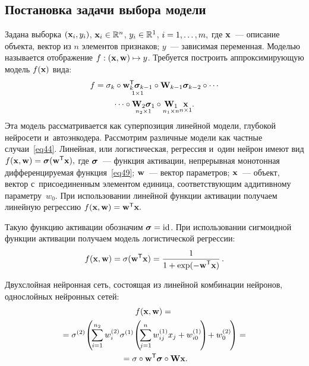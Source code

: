 \begin{multicols}{2}

\section{Постановка задачи выбора модели}

Задана выборка $({\mathbf{x}}_i,y_i)$, $\xb_i \hm\in \mathbb{R}^n$, $y_i\hm\in 
\mathbb{R}^1$, $i\hm=1,\dots,m,$ где ${\mathbf{x}}$~--- описание объекта, вектор из 
$n$ элементов признаков; $y$~--- зависимая переменная. Моделью называется 
отображение $f:({\mathbf{x}},{\mathbf{w}})\mapsto y$. Требуется построить аппроксимирующую 
модель $f({\mathbf{x}})$ вида:
\begin{multline}
\label{eq44}
f = \sigma_k\circ\underset{1\times1}{{\mathbf{w}}_k^\mathsf{T}{\boldsymbol{\sigma}}_{k-
1}}\circ\mathbf{W}_{k-1}{\boldsymbol{\sigma}}_{k-2}\circ\cdots\\
\cdots \circ\underset{n_2 \times 
1}{\mathbf{W}_2{\boldsymbol{\sigma}}_1}\circ \underset{n_1 \times n}{\mathbf{W}_1}\underset{n \times 1}{{\mathbf{x}}}.
\end{multline}
Эта модель рассматривается как суперпозиция линейной модели, глубокой 
нейросети и~автоэнкодера. Рассмотрим различные модели как частные 
случаи~\eqref{eq44}. Линейная, или логистическая, регрессия и~один нейрон 
имеют вид
 $f({\mathbf{x}},{\mathbf{w}})={\boldsymbol{\sigma}}({\mathbf{w}}^\mathsf{T}{\mathbf{x}}),$
где ${\boldsymbol{\sigma}}$~--- функция активации, непрерывная монотонная дифференцируемая 
функция~\eqref{eq49};  ${\mathbf{w}}$~--- вектор параметров; 
${\mathbf{x}}$~--- объект, вектор с~присоединенным элементом единица, соответствующим аддитивному 
параметру~$w_0$. При использовании линейной функции активации получаем 
линейную регрессию $f(\xb,\wm)\hm=\wm^\mathsf{T}\xb.$

Такую функцию активации обозначим $\sigmab \hm= \mathrm{id} $. При 
использовании сигмоидной функции активации получаем модель логистической 
регрессии: 
\begin{equation}
\label{eq49}
f({\mathbf{x}},{\mathbf{w}})=\sigma({\mathbf{w}}^\mathsf{T}{\mathbf{x}})=\displaystyle\frac{\displaystyle 1\mathstrut}{\displaystyle 1+\exp(-{\mathbf{w}}^\mathsf{T}{\mathbf{x}})\mathstrut}\,.
\end{equation}

Двухслойная нейронная сеть, состоящая из линейной комбинации нейронов, 
однослойных нейронных сетей:
\begin{multline*}
f({\mathbf{x}},{\mathbf{w}})={}\\
{}=\sigma^{(2)}\!\left(\!\sum\limits_{i=1}^{n_2}w_i^{(2)}\sigma^{(1)}
\!\left(\!
\sum\limits_{j=1}^{n}w_{ij}^{(1)}x_j+w_{i0}^{(1)}\!\right)\!+w_0^{(2)}\!\right) = {}\\
{}=
\sigma\circ {\mathbf{w}}^{\mathsf{T}}{\boldsymbol{\sigma}}\circ \mathbf{W}{\mathbf{x}}.
\end{multline*}


\end{multicols}
